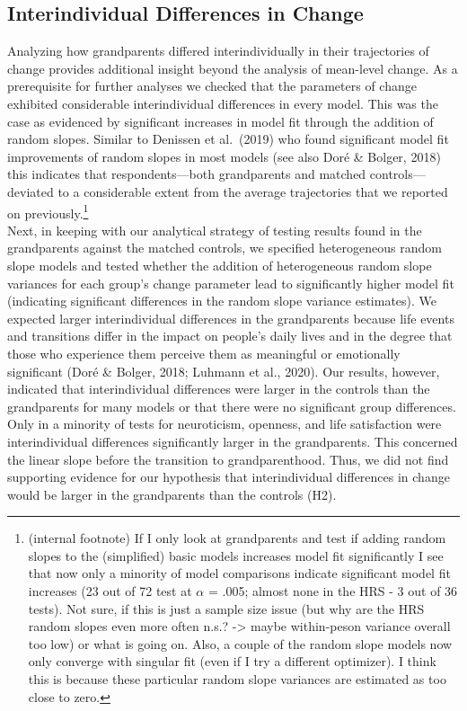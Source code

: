 \documentclass[
  english,
  man, noextraspace]{apa7}
\begin{document}
\hypertarget{interindividual-differences-in-change-1}{%
\subsection{Interindividual Differences in Change}\label{interindividual-differences-in-change-1}}

Analyzing how grandparents differed interindividually in their trajectories of change provides additional insight beyond the analysis of mean-level change. As a prerequisite for further analyses we checked that the parameters of change exhibited considerable interindividual differences in every model. This was the case as evidenced by significant increases in model fit through the addition of random slopes. Similar to Denissen et al.~(2019) who found significant model fit improvements of random slopes in most models (see also Doré \& Bolger, 2018) this indicates that respondents---both grandparents and matched controls---deviated to a considerable extent from the average trajectories that we reported on previously.\footnote{(internal footnote) If I only look at grandparents and test if adding random slopes to the (simplified) basic models increases model fit significantly I see that now only a minority of model comparisons indicate significant model fit increases (23 out of 72 test at \(\alpha\) = .005; almost none in the HRS - 3 out of 36 tests). Not sure, if this is just a sample size issue (but why are the HRS random slopes even more often n.s.? -\textgreater{} maybe within-peson variance overall too low) or what is going on. Also, a couple of the random slope models now only converge with singular fit (even if I try a different optimizer). I think this is because these particular random slope variances are estimated as too close to zero.}\\
Next, in keeping with our analytical strategy of testing results found in the grandparents against the matched controls, we specified heterogeneous random slope models and tested whether the addition of heterogeneous random slope variances for each group's change parameter lead to significantly higher model fit (indicating significant differences in the random slope variance estimates). We expected larger interindividual differences in the grandparents because life events and transitions differ in the impact on people's daily lives and in the degree that those who experience them perceive them as meaningful or emotionally significant (Doré \& Bolger, 2018; Luhmann et al., 2020). Our results, however, indicated that interindividual differences were larger in the controls than the grandparents for many models or that there were no significant group differences. Only in a minority of tests for neuroticism, openness, and life satisfaction were interindividual differences significantly larger in the grandparents. This concerned the linear slope before the transition to grandparenthood. Thus, we did not find supporting evidence for our hypothesis that interindividual differences in change would be larger in the grandparents than the controls (H2).\\
\end{document}
